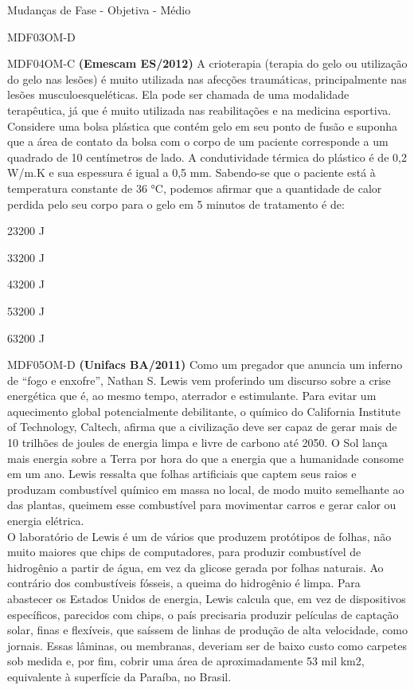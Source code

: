 \documentclass[12pt]{article}
\begin{document}
\begin{quiz}{Mudanças de Fase - Objetiva - Médio}
\begin{multi}[points=1,penalty=0]{MDF03OM-D}
		\end{multi}
		\begin{multi}[points=1,penalty=0]{MDF04OM-C}
			\textbf{(Emescam ES/2012)} A crioterapia (terapia do gelo ou utilização do gelo nas lesões) é muito utilizada nas afecções traumáticas, principalmente nas lesões musculoesqueléticas. Ela pode ser chamada de uma modalidade terapêutica, já que é muito utilizada nas reabilitações e na medicina esportiva. Considere uma bolsa plástica que contém gelo em seu ponto de fusão e suponha que a área de contato da bolsa com o corpo de um paciente corresponde a um quadrado de 10 centímetros de lado. A condutividade térmica do plástico é de 0,2 W/m.K e sua espessura é igual a 0,5 mm. Sabendo-se que o paciente está à temperatura constante de 36 °C, podemos afirmar que a quantidade de calor perdida pelo seu corpo para o gelo em 5 minutos de tratamento é de:												
			\item 23200 J
			\item 33200 J
			\item* 43200 J
			\item 53200 J
			\item 63200 J
		\end{multi}
		\begin{multi}[points=1,penalty=0]{MDF05OM-D}
			\textbf{(Unifacs BA/2011)} Como um pregador que anuncia um inferno de “fogo e enxofre”, Nathan S. Lewis vem proferindo um discurso sobre a crise energética que é, ao mesmo tempo, aterrador e estimulante. Para evitar um aquecimento global potencialmente debilitante, o químico do California Institute of Technology, Caltech, afirma que a civilização deve ser capaz de gerar mais de 10 trilhões de joules de energia limpa e livre de carbono até 2050. O Sol lança mais energia sobre a Terra por hora do que a energia que a humanidade consome em um ano. Lewis ressalta que folhas artificiais que captem seus raios e produzam combustível químico em massa no local, de modo muito semelhante ao das plantas, queimem esse combustível para movimentar carros e gerar calor ou energia elétrica.\\
			O laboratório de Lewis é um de vários que produzem protótipos de folhas, não muito maiores que chips de computadores, para produzir combustível de hidrogênio a partir de água, em vez da glicose gerada por folhas naturais. Ao contrário dos combustíveis fósseis, a queima do hidrogênio é limpa. Para abastecer os Estados Unidos de energia, Lewis calcula que, em vez de dispositivos específicos, parecidos com chips, o país precisaria produzir películas de captação solar, finas e flexíveis, que saíssem de linhas de produção de alta velocidade, como jornais. Essas lâminas, ou membranas, deveriam ser de baixo custo como carpetes sob medida e, por fim, cobrir uma área de aproximadamente 53 mil km2, equivalente à superfície da Paraíba, no Brasil.\\ 

\end{multi}
\end{quiz}
\end{document}
